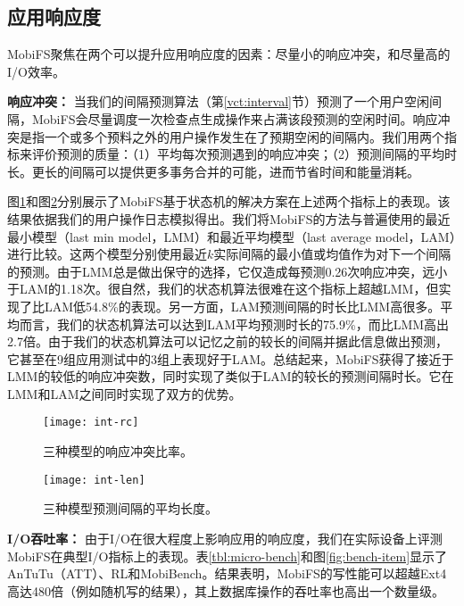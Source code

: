 \subsection{应用响应度} \label{vct:eval-resp}

MobiFS聚焦在两个可以提升应用响应度的因素：尽量小的响应冲突，和尽量高的I/O效率。

\noindent\textbf{响应冲突：}
当我们的间隔预测算法（第\ref{vct:interval}节）预测了一个用户空闲间隔，MobiFS会尽量调度一次检查点生成操作来占满该段预测的空闲时间。响应冲突是指一个或多个预料之外的用户操作发生在了预期空闲的间隔内。我们用两个指标来评价预测的质量：（1）平均每次预测遇到的响应冲突；（2）预测间隔的平均时长。更长的间隔可以提供更多事务合并的可能，进而节省时间和能量消耗。

图\ref{fig:int-rc}和图\ref{fig:int-len}分别展示了MobiFS基于状态机的解决方案在上述两个指标上的表现。该结果依据我们的用户操作日志模拟得出。我们将MobiFS的方法与普遍使用的最近最小模型（last min model，LMM）和最近平均模型（last average model，LAM）进行比较。这两个模型分别使用最近$k$实际间隔的最小值或均值作为对下一个间隔的预测。由于LMM总是做出保守的选择，它仅造成每预测0.26次响应冲突，远小于LAM的1.18次。很自然，我们的状态机算法很难在这个指标上超越LMM，但实现了比LAM低54.8\%的表现。另一方面，LAM预测间隔的时长比LMM高很多。平均而言，我们的状态机算法可以达到LAM平均预测时长的75.9\%，而比LMM高出2.7倍。由于我们的状态机算法可以记忆之前的较长的间隔并据此信息做出预测，它甚至在9组应用测试中的3组上表现好于LAM。总结起来，MobiFS获得了接近于LMM的较低的响应冲突数，同时实现了类似于LAM的较长的预测间隔时长。它在LMM和LAM之间同时实现了双方的优势。

\begin{figure}[!ht]
  \centering
  \texttt{[image: int-rc]}
  \caption{三种模型的响应冲突比率。}
  \label{fig:int-rc}
\end{figure}

\begin{figure}[!ht]
  \centering
  \texttt{[image: int-len]}
  \caption{三种模型预测间隔的平均长度。}
  \label{fig:int-len}
\end{figure}

\noindent\textbf{I/O吞吐率：}
由于I/O在很大程度上影响应用的响应度，我们在实际设备上评测MobiFS在典型I/O指标上的表现。表\ref{tbl:micro-bench}和图\ref{fig:bench-item}显示了AnTuTu（ATT）、RL和MobiBench。结果表明，MobiFS的写性能可以超越Ext4高达480倍（例如随机写的结果），其上数据库操作的吞吐率也高出一个数量级。

